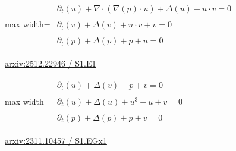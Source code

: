 \documentclass[10pt,a4paper]{article}
\begin{document}
\begin{minipage}{\linewidth}
\begin{center}\begin{adjustbox}{max width=\linewidth}$\displaystyle\begin{gathered}\begin{gathered}\partial_{t}(u)+\nabla\cdot(\nabla(p)\cdot u)+\Delta(u)+u\cdot v=0\end{gathered}\\[5pt]\begin{gathered}\partial_{t}(v)+\Delta(v)+u\cdot v+v=0\end{gathered}\\[5pt]\begin{gathered}\partial_{t}(p)+\Delta(p)+p+u=0\end{gathered}\end{gathered}$\end{adjustbox}\end{center}
{\small \href{https://arxiv.org/html/2512.22946#S1.E1}{arxiv:2512.22946 / S1.E1}}\par
\end{minipage}\par\vspace{7mm}

\begin{minipage}{\linewidth}
\begin{center}\begin{adjustbox}{max width=\linewidth}$\displaystyle\begin{gathered}\begin{gathered}\partial_{t}(u)+\Delta(v)+p+v=0\end{gathered}\\[5pt]\begin{gathered}\partial_{t}(u)+\Delta(u)+u^{3}+u+v=0\end{gathered}\\[5pt]\begin{gathered}\partial_{t}(p)+\Delta(p)+p+v=0\end{gathered}\end{gathered}$\end{adjustbox}\end{center}
{\small \href{https://arxiv.org/html/2311.10457#S1.EGx1}{arxiv:2311.10457 / S1.EGx1}}\par
\end{minipage}\par\vspace{7mm}
\end{document}
